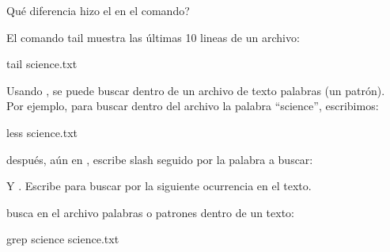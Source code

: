 \documentclass[letterpaper,10pt,english]{jupyterBook}
\begin{document}
\sphinxAtStartPar
Qué diferencia hizo el  en el comando?

\sphinxAtStartPar
{}

\sphinxAtStartPar
El comando tail muestra las últimas 10 lineas de un archivo:

\begin{sphinxVerbatim}[commandchars=\\\{\}]
\PYGZdl{} tail science.txt
\end{sphinxVerbatim}



\begin{DUlineblock}{0em}
\item[] 
\end{DUlineblock}

\sphinxAtStartPar
{}

\sphinxAtStartPar
Usando , se puede buscar dentro de un archivo de texto palabras (un patrón). Por ejemplo, para buscar dentro del archivo  la palabra “science”, escribimos:

\begin{sphinxVerbatim}[commandchars=\\\{\}]
\PYGZdl{} less science.txt
\end{sphinxVerbatim}

\sphinxAtStartPar
después, aún en , escribe slash \sphinxcode{\sphinxupquote{{[}/{]}}} seguido por la palabra a buscar:

\begin{sphinxVerbatim}[commandchars=\\\{\}]
\end{sphinxVerbatim}

\sphinxAtStartPar
Y \sphinxcode{\sphinxupquote{{[}enter{]}}}. Escribe \sphinxcode{\sphinxupquote{{[}n{]}}} para buscar por la siguiente ocurrencia en el texto.

\sphinxAtStartPar
{}

\sphinxAtStartPar
{} busca en el archivo palabras o patrones dentro de un texto:

\begin{sphinxVerbatim}[commandchars=\\\{\}]
\PYGZdl{} grep science science.txt
\end{sphinxVerbatim}
\end{document}
